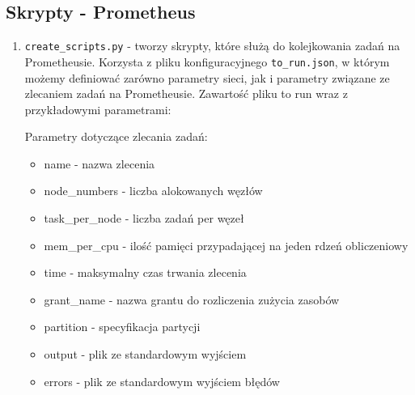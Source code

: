\subsection{Skrypty - Prometheus}
\begin{enumerate}
	\item {\texttt{create\_scripts.py} } - 
	tworzy skrypty, które służą do kolejkowania zadań na Prometheusie. Korzysta z pliku konfiguracyjnego \texttt{to\_run.json},
	w którym możemy definiować zarówno parametry sieci, jak i parametry związane ze zlecaniem zadań na Prometheusie.
	Zawartość pliku to run wraz z przykładowymi parametrami:
	
	\begin{import}
		[
		  {
		    "beginning": "#!/bin/sh",
		    "name": "#SBATCH -J test",
		    "node_numbers": "#SBATCH -N 1",
		    "tasks_per_node": "#SBATCH --ntasks-per-node=1",
		    "mem_per_cpu": "#SBATCH --mem-per-cpu=5GB",
		    "time": "#SBATCH --time=00:20:00",
		    "grant_name": "#SBATCH -A ap2018",
		    "partition": "#SBATCH -p plgrid",
		    "output": "#SBATCH --output=",
		    "errors": "#SBATCH --error=",
		    "hidden_size": "100",
		    "num_layers": "2",
		    "num_epochs": "5",
		    "batch_size": "40",
		    "timesteps": "50",
		    "learning_rate": "0.04",
		    "authors_size": "100",
		    "vocab_size": "48",
		    "save_path": "../results/",
		    "learning_tensors_path": "../data/dutch/tensors/known/",
		    "testing_tensors_path": "../data/dutch/tensors/known/",
		    "language": "DU"
		  }
		]
	\end{import}
	
	Parametry dotyczące zlecania zadań:
	\begin{itemize}
	  \item name - nazwa zlecenia
	  \item node\_numbers - liczba alokowanych węzłów
	  \item task\_per\_node - liczba zadań per węzeł
	  \item mem\_per\_cpu - ilość pamięci przypadającej na jeden rdzeń obliczeniowy
	  \item time - maksymalny czas trwania zlecenia
	  \item grant\_name - nazwa grantu do rozliczenia zużycia zasobów
	  \item partition - specyfikacja partycji
	  \item output - plik ze standardowym wyjściem
	  \item errors - plik ze standardowym wyjściem błędów
	\end{itemize}
	

\end{enumerate}
